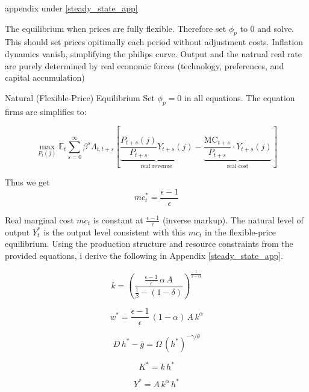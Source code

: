 \documentclass[11pt,preprint]{elsarticle}
\numberwithin{equation}{section}
\numberwithin{figure}{section}
\numberwithin{table}{section}
\begin{document}
appendix under \ref{steady_state_app}

The equilibrium when prices are fully flexible. Therefore set \(\phi_p\)
to 0 and solve. This should set prices opitimally each period without
adjustment costs. Inflation dynamics vanish, simplifying the philips
curve. Output and the natrual real rate are purely determined by real
economic forces (technology, preferences, and capital accumulation)

Natural (Flexible-Price) Equilibrium Set \(\phi_p = 0\) in all
equations. The equation firms are simplifies to:

\begin{equation}
\max_{P_t(j)} \mathbb{E}_t \sum_{s=0}^{\infty} \beta^s \Lambda_{t,t+s} \left[
\underbrace{\frac{P_{t+s}(j)}{P_{t+s}} Y_{t+s}(j)}_{\text{real revenue}} 
- \underbrace{\frac{\text{MC}_{t+s}}{P_{t+s}} \cdot Y_{t+s}(j)}_{\text{real cost}} 
\right]
\label{intermediate_objective_frictionless}
\end{equation}

Thus we get \begin{equation}
mc^*_t = \frac{\epsilon - 1}{\epsilon}
\end{equation}

Real marginal cost \(mc_t\) is constant at
\(\frac{\epsilon - 1}{\epsilon}\) (inverse markup). The natural level of
output \(Y_t^*\) is the output level consistent with this \(mc_t\) in
the flexible-price equilibrium. Using the production structure and
resource constraints from the provided equations, i derive the following
in Appendix \ref{steady_state_app}.

\begin{equation}\label{eq:k_ss}
k = \left(\frac{\tfrac{\epsilon-1}{\epsilon}\,\alpha\,A}{\tfrac{1}{\beta} - (1-\delta)}\right)^{\!\frac{1}{1-\alpha}}
\end{equation}

\begin{equation}\label{eq:w_ss}
w^* = \frac{\epsilon-1}{\epsilon}\,(1-\alpha)\,A\,k^\alpha
\end{equation}

\begin{equation}\label{eq:h_ss}
D\,h^* - \bar{g} = \Omega\,(h^*)^{-\gamma/\theta}
\end{equation}

\begin{equation}\label{eq:K_ss}
K^* = k\,h^*
\end{equation}

\begin{equation}\label{eq:Y_ss}
Y^* = A\,k^\alpha\,h^*
\end{equation}
\end{document}
